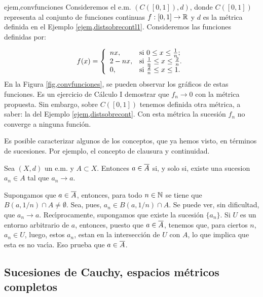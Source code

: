 \begin{ejemplo}{ejem,convfunciones} Consideremos el e.m. $(C([0,1]),d)$, donde
$C([0,1])$ representa al conjunto de funciones continuas
$f:[0,1]\rightarrow\mathbb{R}$ y $d$ es la métrica definida en el
Ejemplo \vref{ejem,distsobrecontl1}. Consideremos las funciones
definidas por:

\[
    f(x)=\left\{%
\begin{array}{ll}
    nx, & \hbox{si $0\leq x\leq \frac1n$;} \\
    2-nx, & \hbox{si $\frac1n\leq x\leq \frac2n$.} \\
    0,    &\hbox{si $\frac2n\leq x\leq 1.$}
\end{array}%
\right.
\]
En la Figura \vref{fig,convfunciones}, se pueden observar los
gráficos de estas funciones.
Es un ejercicio de Cálculo I demostrar que $f_n\rightarrow 0$
con la métrica propuesta. Sin embargo, sobre $C([0,1])$ tenemos
definida otra métrica, a saber: la del Ejemplo
\vref{ejem,distsobrecont}. Con esta métrica la sucesión $f_n$
no converge a ninguna función.
\end{ejemplo}

Es posible caracterizar algunos de los conceptos, que ya hemos
visto, en términos de sucesiones. Por ejemplo, el concepto de
clausura y continuidad.

\begin{proposicion}{} Sea $(X,d)$ un e.m. y $A\subset X$. Entonces
$a\in\overline{A}$ si, y solo si, existe una sucesion $a_n\in A$ tal que
$a_n\rightarrow a$.
\end{proposicion}
\begin{demo} Supongamos que $a\in\overline{A}$, entonces, para todo
$n\in\mathbb{N}$ se tiene que $B(a,1/n)\cap A\neq\emptyset$. Sea, pues,
$a_n\in B(a,1/n)\cap A$. Se puede ver, sin dificultad, que
$a_n\rightarrow a$. Rec\'{\i}procamente, supongamos que existe la
sucesión $\{a_n\}$. Si $U$ es un entorno arbitrario de $a$,
entonces, puesto que $a\in\overline{A}$, tenemos que, para ciertos $n$,
$a_n\in U$, luego, estos $a_n$, estan en la intersección de $U$
con $A$, lo que implica que esta es no vac\'{\i}a. Eso prueba que
$a\in\overline{A}$.
\end{demo}

\subsection{Sucesiones de Cauchy, espacios métricos completos}


